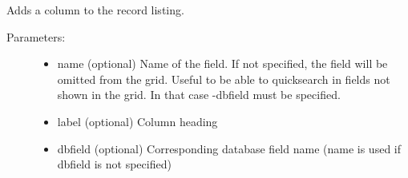 \documentclass[letterpaper,10pt,english]{sphinxmanual}
\begin{document}
\begin{fulllineitems}
\begin{fulllineitems}
\end{fulllineitems}


\begin{fulllineitems}
\label{knop_grid:knop_grid.footer}
\end{fulllineitems}



\begin{fulllineitems}
\end{fulllineitems}


\begin{fulllineitems}
\label{knop_grid:knop_grid.insert}
\end{fulllineitems}


\begin{fulllineitems}
Adds a column to the record listing.
\begin{description}
\item[{Parameters:}] \leavevmode\begin{itemize}
\item {} 
name (optional)
Name of the field. If not specified, the field will be omitted from the grid.
Useful to be able to quicksearch in fields not shown in the grid.
In that case -dbfield must be specified.

\item {} 
label (optional)
Column heading

\item {} 
dbfield (optional)
Corresponding database field name (name is used if dbfield is not specified)


\end{itemize}
\end{description}
\end{fulllineitems}
\end{fulllineitems}
\end{document}
